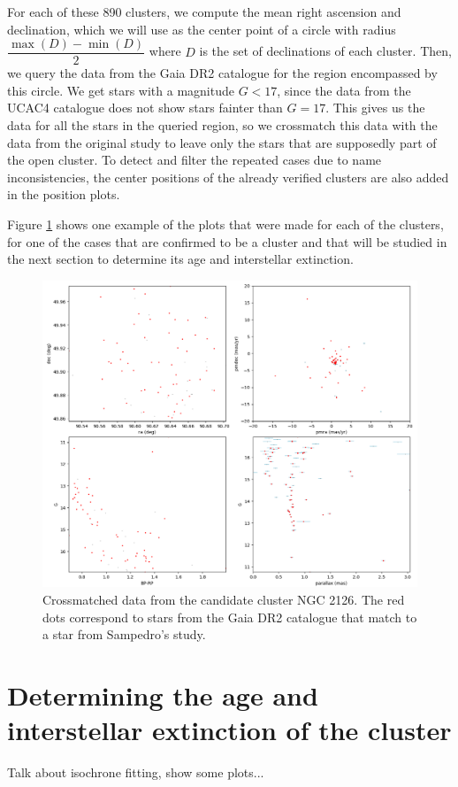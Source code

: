 \documentclass[twocolumn]{revtex4}
\begin{document}
For each of these 890 clusters, we compute the mean right ascension and declination, which we will use as the center point of a circle with radius $\dfrac{\max(D) - \min(D)}{2}$ where $D$ is the set of declinations of each cluster. Then, we query the data from the Gaia DR2 catalogue for the region encompassed by this circle. We get stars with a magnitude $G < 17$, since the data from the UCAC4 catalogue does not show stars fainter than $G = 17$. This gives us the data for all the stars in the queried region, so we crossmatch this data with the data from the original study to leave only the stars that are supposedly part of the open cluster. To detect and filter the repeated cases due to name inconsistencies, the center positions of the already verified clusters are also added in the position plots.

Figure \ref{crossmatched_data} shows one example of the plots that were made for each of the clusters, for one of the cases that are confirmed to be a cluster and that will be studied in the next section to determine its age and interstellar extinction.

\begin{figure}[h!]
\centering
\includegraphics[scale=0.3]{NGC_2126_crossmatch}
\caption{Crossmatched data from the candidate cluster NGC 2126. The red dots correspond to stars from the Gaia DR2 catalogue that match to a star from Sampedro's study.}
\label{crossmatched_data}
\end{figure}


\section{Determining the age and interstellar extinction of the cluster}
Talk about isochrone fitting, show some plots...
\end{document}
